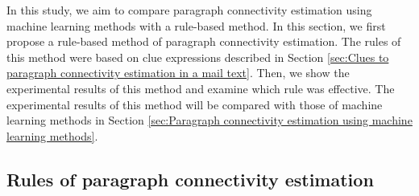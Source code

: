 \documentclass[english]{jnlp_1.4}
\begin{document}
In this study, 
we aim to compare paragraph connectivity estimation 
using machine learning methods 
with a rule-based method.
In this section,
we first propose a rule-based method of paragraph connectivity estimation.
The rules of this method were based on clue expressions described 
in Section \ref{sec:Clues to paragraph connectivity estimation in a mail text}.
Then, 
we show the experimental results of this method and 
examine which rule was effective.
The experimental results of this method will be compared with 
those of machine learning methods 
in Section \ref{sec:Paragraph connectivity estimation using machine learning methods}.



\subsection{Rules of paragraph connectivity estimation}
\label{subsec:Rules of paragraph connectivity estimation}
\end{document}
